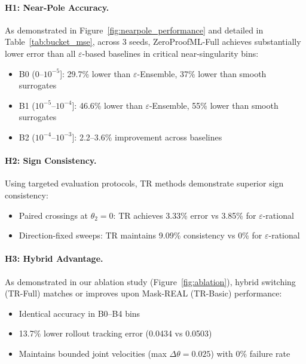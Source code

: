 \documentclass[twoside,11pt]{article}
\begin{document}
\paragraph{H1: Near-Pole Accuracy.}
As demonstrated in Figure~\ref{fig:nearpole_performance} and detailed in Table~\ref{tab:bucket_mse}, across 3 seeds, ZeroProofML-Full achieves substantially lower error than all $\varepsilon$-based baselines in critical near-singularity bins:
\begin{itemize}
\item B0 (0--$10^{-5}$]: 29.7\% lower than $\varepsilon$-Ensemble, 37\% lower than smooth surrogates
\item B1 ($10^{-5}$--$10^{-4}$]: 46.6\% lower than $\varepsilon$-Ensemble, 55\% lower than smooth surrogates  
\item B2 ($10^{-4}$--$10^{-3}$]: 2.2--3.6\% improvement across baselines
\end{itemize}

\paragraph{H2: Sign Consistency.}
Using targeted evaluation protocols, TR methods demonstrate superior sign consistency:
\begin{itemize}
\item Paired crossings at $\theta_2=0$: TR achieves 3.33\% error vs 3.85\% for $\varepsilon$-rational
\item Direction-fixed sweeps: TR maintains 9.09\% consistency vs 0\% for $\varepsilon$-rational
\end{itemize}

\paragraph{H3: Hybrid Advantage.}
As demonstrated in our ablation study (Figure~\ref{fig:ablation}), hybrid switching (TR-Full) matches or improves upon Mask-REAL (TR-Basic) performance:
\begin{itemize}
\item Identical accuracy in B0--B4 bins  
\item 13.7\% lower rollout tracking error (0.0434 vs 0.0503)
\item Maintains bounded joint velocities (max $\Delta\theta = 0.025$) with 0\% failure rate
\end{itemize}

\end{document}
